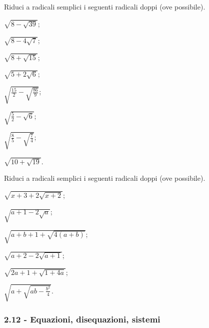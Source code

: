 \begin{esercizio}
 \label{ese:2.97}
Riduci a radicali semplici i seguenti radicali doppi (ove possibile).
 \begin{multicols}{4}
 \begin{enumeratea}
 \item $\sqrt{8-\sqrt{39}}$;
 \item $\sqrt{8-4\sqrt 7}$;
 \item $\sqrt{8+\sqrt{15}}$;
 \item $\sqrt{5+2\sqrt 6}$;
 \item $\sqrt{\frac{15} 2-\sqrt{\frac{86} 9}}$;
 \item $\sqrt{\frac 5 2-\sqrt 6}$;
 \item $\sqrt{\frac 8 5-\sqrt{\frac 7 4}}$;
 \item $\sqrt{10+\sqrt{19}}$.
 \end{enumeratea}
 \end{multicols}
\end{esercizio}

\begin{esercizio}[\Ast]
 \label{ese:2.98}
Riduci a radicali semplici i seguenti radicali doppi (ove possibile).
 \begin{multicols}{2}
 \begin{enumeratea}
 \item $\sqrt{x+3+2\sqrt{x+2}}$;
 \item $\sqrt{a+1-2\sqrt{a}}$;
 \item $\sqrt{a+b+1+\sqrt{4(a+b)}}$;
 \item $\sqrt{a+2-2\sqrt{a+1}}$;
 \item $\sqrt{2a+1+\sqrt{1+4a}}$;
 \item $\sqrt{a+\sqrt{ab-\frac{b^{2}}{4}}}$.
 \end{enumeratea}
 \end{multicols}
\end{esercizio}

\subsubsection*{2.12 - Equazioni, disequazioni, sistemi}


